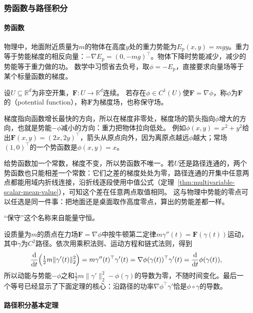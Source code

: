 \subsubsection{势函数与路径积分}

\paragraph{势函数}

物理中，地面附近质量为$m$的物体在高度$y$处的重力势能为$E_{\mathrm p}(x,y)=mgy$。重力等于势能梯度的相反向量：$-\nabla E_{\mathrm p}=(0,-mg)^\top$。物体下降时势能减少，减少的势能等于重力做的功。
数学中习惯省去负号，取$\phi=-E_{\mathrm p}$，直接要求向量场等于某个标量函数的梯度。
\begin{definition}[势函数]
设$U\subseteq\mathbb R^d$为非空开集，$\bm F:U\to\mathbb R^d$连续。
若存在$\phi\in C^1(U)$使$\bm F=\nabla\phi$，称$\phi$为$\bm F$的（potential function），称$\bm F$为梯度场，也称保守场。
\end{definition}

梯度指向函数增长最快的方向，所以在梯度非零处，梯度场的箭头指向$\phi$增大的方向，也就是势能$-\phi$减小的方向：重力把物体拉向低处。
例如$\phi(x,y)=x^2+y^2$给出$\bm F(x,y)=(2x,2y)^\top$，箭头从原点向外，因为离原点越远$\phi$越大；常场$(1,0)^\top$的一个势函数是$\phi(x,y)=x$。

给势函数加一个常数，梯度不变，所以势函数不唯一。若$U$还是路径连通的，两个势函数也只能相差一个常数：它们之差的梯度处处为零，路径连通的开集中任意两点都能用域内折线连接，沿折线逐段使用中值公式（定理~\ref{thm:multivariable-scalar-mean-value}），可知这个差在任意两点取值相同。
这与物理中势能的零点可以任选是同一件事：把地面还是桌面取作高度零点，算出的势能差都一样。

“保守”这个名称来自能量守恒。

设质量为$m$的质点在力场$\bm F=\nabla\phi$中按牛顿第二定律$m\gamma''(t)=\bm F(\gamma(t))$运动，其中$\gamma$为$C^2$路径。依次用乘积法则、运动方程和链式法则，得到
\[
 \frac{\mathrm d}{\mathrm dt}\Bigl(\tfrac12m\lVert\gamma'(t)\rVert_2^2\Bigr)
 =m\gamma''(t)^\top\gamma'(t)=\nabla\phi(\gamma(t))^\top\gamma'(t)
 =\frac{\mathrm d}{\mathrm dt}\phi(\gamma(t)),
\]
所以动能与势能$-\phi$之和$\frac12m\lVert\gamma'\rVert_2^2-\phi(\gamma)$的导数为零，不随时间变化。最后一个等号已经显示了下面定理的核心：沿路径的功率$\nabla\phi^\top\gamma'$恰是$\phi\circ\gamma$的导数。

\paragraph{路径积分基本定理}

